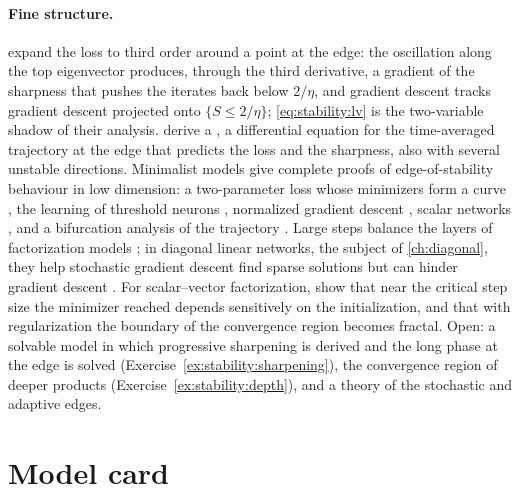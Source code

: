 \begin{refsection}
\paragraph{Fine structure.} \Textcite{DamianNichaniLee2023} expand the loss to third order around a point at the edge: the oscillation along the top eigenvector produces, through the third derivative, a gradient of the sharpness that pushes the iterates back below $2/\eta$, and gradient descent tracks gradient descent projected onto $\{S\le2/\eta\}$; \eqref{eq:stability:lv} is the two-variable shadow of their analysis. \Textcite{CohenEtAl2025} derive a , a differential equation for the time-averaged trajectory at the edge that predicts the loss and the sharpness, also with several unstable directions. Minimalist models give complete proofs of edge-of-stability behaviour in low dimension: a two-parameter loss whose minimizers form a curve \parencite{ZhuEtAl2023}, the learning of threshold neurons \parencite{AhnEtAl2023}, normalized gradient descent \parencite{AroraLiPanigrahi2022}, scalar networks \parencite{KreislerEtAl2023}, and a bifurcation analysis of the trajectory \parencite{SongYun2023}. Large steps balance the layers of factorization models \parencite{WangEtAl2022}; in diagonal linear networks, the subject of \cref{ch:diagonal}, they help stochastic gradient descent find sparse solutions but can hinder gradient descent \parencite{EvenEtAl2023}. For scalar--vector factorization, \textcite{LiangMontufar2026} show that near the critical step size the minimizer reached depends sensitively on the initialization, and that with regularization the boundary of the convergence region becomes fractal. Open: a solvable model in which progressive sharpening is derived and the long phase at the edge is solved (Exercise~\ref{ex:stability:sharpening}), the convergence region of deeper products (Exercise~\ref{ex:stability:depth}), and a theory of the stochastic and adaptive edges.

\section{Model card}\label{sec:stability:card}


\end{refsection}
